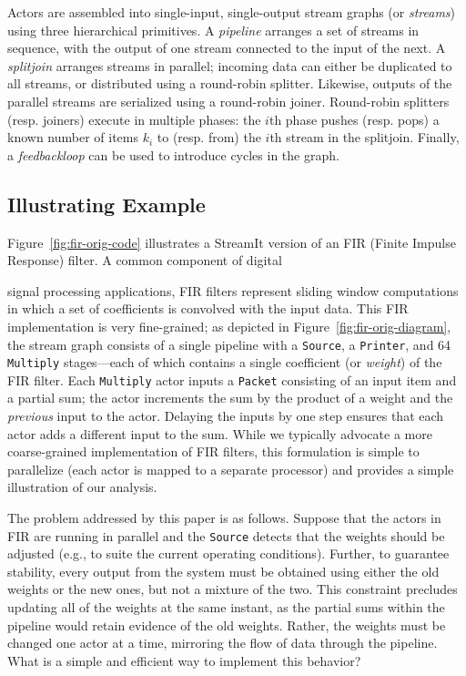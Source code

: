 Actors are assembled into single-input, single-output stream graphs
(or {\it streams}) using three hierarchical primitives.  A {\it
pipeline} arranges a set of streams in sequence, with the output of
one stream connected to the input of the next.  A {\it splitjoin}
arranges streams in parallel; incoming data can either be duplicated
to all streams, or distributed using a round-robin splitter.
Likewise, outputs of the parallel streams are serialized using a
round-robin joiner.  Round-robin splitters (resp. joiners) execute in
multiple phases: the $i$th phase pushes (resp. pops) a known number of
items $k_i$ to (resp. from) the $i$th stream in the splitjoin.
Finally, a {\it feedbackloop} can be used to introduce cycles in the
graph.

\subsection{Illustrating Example}

Figure~\ref{fig:fir-orig-code} illustrates a StreamIt version of an
FIR (Finite Impulse Response) filter.  A common component of digital
%

\noindent 
%
signal processing applications, FIR filters represent sliding window
computations in which a set of coefficients is convolved with the
input data.  This FIR implementation is very fine-grained; as depicted
in Figure~\ref{fig:fir-orig-diagram}, the stream graph consists of a
single pipeline with a {\tt Source}, a {\tt Printer}, and 64 {\tt
Multiply} stages---each of which contains a single coefficient (or
{\it weight}) of the FIR filter.  Each {\tt Multiply} actor inputs a
{\tt Packet} consisting of an input item and a partial sum; the actor
increments the sum by the product of a weight and the {\it previous}
input to the actor.  Delaying the inputs by one step ensures that each
actor adds a different input to the sum.  While we typically advocate
a more coarse-grained implementation of FIR filters, this formulation
is simple to parallelize (each actor is mapped to a separate
processor) and provides a simple illustration of our analysis.

The problem addressed by this paper is as follows.  Suppose that the
actors in FIR are running in parallel and the {\tt Source} detects
that the weights should be adjusted (e.g., to suite the current
operating conditions).  Further, to guarantee stability, every output
from the system must be obtained using either the old weights or the
new ones, but not a mixture of the two.  This constraint precludes
updating all of the weights at the same instant, as the partial sums
within the pipeline would retain evidence of the old weights.  Rather,
the weights must be changed one actor at a time, mirroring the flow of
data through the pipeline.  What is a simple and efficient way to
implement this behavior?

